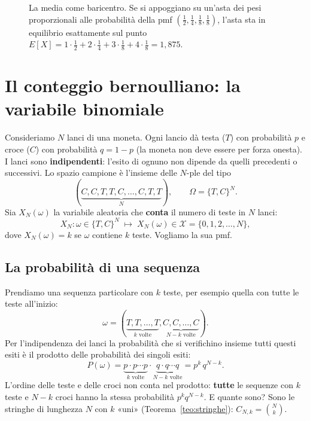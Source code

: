 \begin{figure}[H]
\centering
{}
\caption{La media come baricentro. Se si appoggiano su un'asta dei pesi proporzionali alle probabilità della pmf
$\left(\frac12, \frac14, \frac18, \frac18\right)$, l'asta sta in equilibrio esattamente sul punto
$E[X] = 1 \cdot \frac12 + 2 \cdot \frac14 + 3 \cdot \frac18 + 4 \cdot \frac18 = 1{,}875$.}
\end{figure}

\section{Il conteggio bernoulliano: la variabile binomiale}

Consideriamo $N$ lanci di una moneta. Ogni lancio dà testa ($T$) con probabilità $p$ e croce ($C$) con probabilità
$q = 1 - p$ (la moneta non deve essere per forza onesta). I lanci sono \textbf{indipendenti}: l'esito di ognuno non
dipende da quelli precedenti o successivi. Lo spazio campione è l'insieme delle $N$-ple del tipo
\[ (\underbrace{C, C, T, T, C, \ldots, C, T, T}_{N}) , \qquad \Omega = \{T, C\}^N . \]
Sia $X_N(\omega)$ la variabile aleatoria che \textbf{conta} il numero di teste in $N$ lanci:
\[ X_N : \omega \in \{T, C\}^N \;\longmapsto\; X_N(\omega) \in \mathcal{X} = \{0, 1, 2, \ldots, N\} , \]
dove $X_N(\omega) = k$ se $\omega$ contiene $k$ teste. Vogliamo la sua pmf.

\subsection{La probabilità di una sequenza}

Prendiamo una sequenza particolare con $k$ teste, per esempio quella con tutte le teste all'inizio:
\[ \omega = (\underbrace{T, T, \ldots, T}_{k \text{ volte}}, \underbrace{C, C, \ldots, C}_{N - k \text{ volte}}) . \]
Per l'indipendenza dei lanci la probabilità che si verifichino insieme tutti questi esiti è il prodotto delle
probabilità dei singoli esiti:
\[ P(\omega) = \underbrace{p \cdot p \cdots p}_{k \text{ volte}} \cdot \underbrace{q \cdot q \cdots q}_{N - k \text{ volte}}
   = p^k\, q^{N-k} . \]
L'ordine delle teste e delle croci non conta nel prodotto: \textbf{tutte} le sequenze con $k$ teste e $N - k$ croci
hanno la stessa probabilità $p^k q^{N-k}$. E quante sono? Sono le stringhe di lunghezza $N$ con $k$ «uni»
(Teorema~\ref{teo:stringhe}): $C_{N,k} = \binom{N}{k}$.

